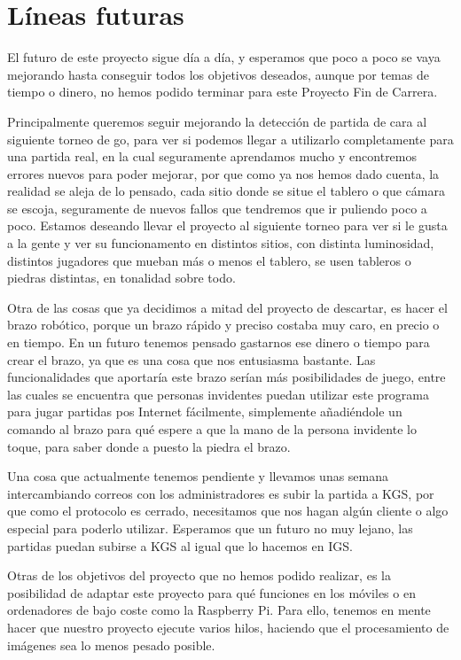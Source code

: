\documentclass[12pt,a4papert,woside,openright,titlepage,final]{book}
\begin{document}
\chapter{Líneas futuras}

El futuro de este proyecto sigue día a día, y esperamos que poco a poco se vaya
mejorando hasta conseguir todos los objetivos deseados, aunque por temas de
tiempo o dinero, no hemos podido terminar para este Proyecto Fin de Carrera. 

Principalmente queremos seguir mejorando la detección de partida de cara al
siguiente torneo de go, para ver si podemos llegar a utilizarlo completamente
para una partida real, en la cual seguramente aprendamos mucho y encontremos
errores nuevos para poder mejorar, por que como ya nos hemos dado cuenta, la
realidad se aleja de lo pensado, cada sitio donde se situe el tablero o que
cámara se escoja, seguramente de nuevos fallos que tendremos que ir puliendo
poco a poco. Estamos deseando llevar el proyecto al siguiente torneo para ver si
le gusta a la gente y ver su funcionamento en distintos sitios, con distinta
luminosidad, distintos jugadores que mueban más o menos el tablero, se usen
tableros o piedras distintas, en tonalidad sobre todo. 

Otra de las cosas que ya decidimos a mitad del proyecto de descartar, es hacer
el brazo robótico, porque un brazo rápido y preciso costaba muy caro, en precio
o en tiempo. En un futuro tenemos pensado gastarnos ese dinero o tiempo para
crear el brazo, ya que es una cosa que nos entusiasma bastante. Las
funcionalidades que aportaría este brazo serían más posibilidades de juego,
entre las cuales se encuentra que personas invidentes puedan utilizar este
programa para jugar partidas pos Internet fácilmente, simplemente añadiéndole un
comando al brazo para qué espere a que la mano de la persona invidente lo toque,
para saber donde a puesto la piedra el brazo. 

Una cosa que actualmente tenemos pendiente y llevamos unas semana intercambiando
correos con los administradores es subir la partida a KGS, por que como el
protocolo es cerrado, necesitamos que nos hagan algún cliente o algo especial
para poderlo utilizar. Esperamos que un futuro no muy lejano, las partidas
puedan subirse a KGS al igual que lo hacemos en IGS. 

Otras de los objetivos del proyecto que no hemos podido realizar, es la
posibilidad de adaptar este proyecto para qué funciones en los móviles o en
ordenadores de bajo coste como la Raspberry Pi. Para ello, tenemos en mente hacer
que nuestro proyecto ejecute varios hilos, haciendo que el procesamiento de
imágenes sea lo menos pesado posible.
\end{document}
